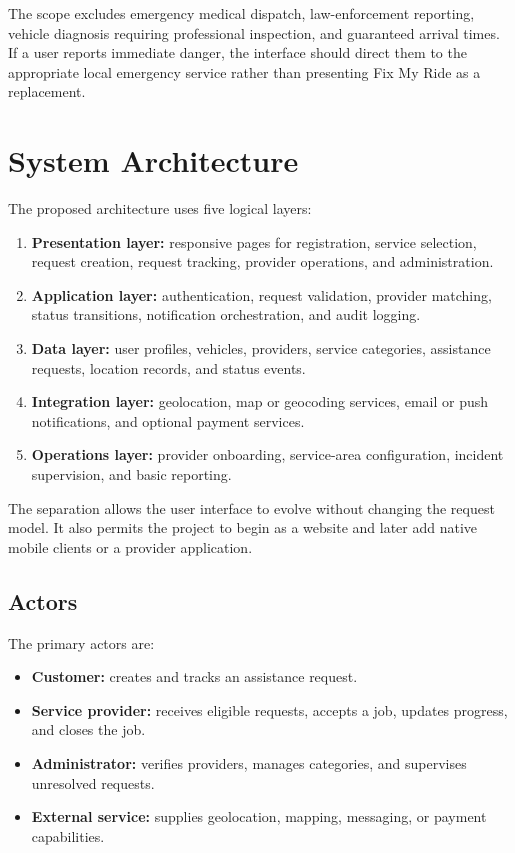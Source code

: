 \documentclass[conference]{IEEEtran}
\begin{document}
The scope excludes emergency medical dispatch, law-enforcement reporting, vehicle diagnosis requiring professional inspection, and guaranteed arrival times. If a user reports immediate danger, the interface should direct them to the appropriate local emergency service rather than presenting Fix My Ride as a replacement.

\section{System Architecture}
The proposed architecture uses five logical layers:
\begin{enumerate}
    \item \textbf{Presentation layer:} responsive pages for registration, service selection, request creation, request tracking, provider operations, and administration.
    \item \textbf{Application layer:} authentication, request validation, provider matching, status transitions, notification orchestration, and audit logging.
    \item \textbf{Data layer:} user profiles, vehicles, providers, service categories, assistance requests, location records, and status events.
    \item \textbf{Integration layer:} geolocation, map or geocoding services, email or push notifications, and optional payment services.
    \item \textbf{Operations layer:} provider onboarding, service-area configuration, incident supervision, and basic reporting.
\end{enumerate}

The separation allows the user interface to evolve without changing the request model. It also permits the project to begin as a website and later add native mobile clients or a provider application.

\subsection{Actors}
The primary actors are:
\begin{itemize}
    \item \textbf{Customer:} creates and tracks an assistance request.
    \item \textbf{Service provider:} receives eligible requests, accepts a job, updates progress, and closes the job.
    \item \textbf{Administrator:} verifies providers, manages categories, and supervises unresolved requests.
    \item \textbf{External service:} supplies geolocation, mapping, messaging, or payment capabilities.
\end{itemize}
\end{document}
